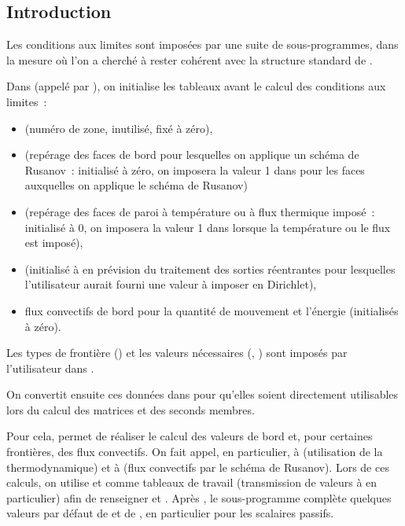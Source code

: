 \subsection*{Introduction}

Les conditions aux limites sont impos\'ees par une suite de sous-programmes,
dans la mesure o\`u l'on a cherch\'e \`a rester coh\'erent avec la structure
standard de \CS.

Dans  (appel\'e par ), on initialise les tableaux
avant le calcul des conditions aux limites~:
\begin{itemize}
\item {} (num\'ero de zone, inutilis\'e, fix\'e \`a z\'ero),
\item {} (rep\'erage des faces de bord pour
lesquelles on applique un sch\'ema de Rusanov~: initialis\'e \`a z\'ero,
on imposera la valeur 1 dans  pour les faces auxquelles on applique le sch\'ema
de Rusanov)
\item {} (rep\'erage des faces de paroi \`a temp\'erature ou
\`a flux thermique impos\'e~: initialis\'e \`a 0, on imposera la valeur 1
dans  lorsque la temp\'erature ou le flux est impos\'e),
\item {} (initialis\'e \`a  en pr\'evision
du traitement des sorties r\'eentrantes pour lesquelles l'utilisateur
aurait fourni une valeur \`a imposer en Dirichlet),
\item flux convectifs de bord pour la quantit\'e de mouvement et l'\'energie
(initialis\'es \`a z\'ero).
\end{itemize}


\bigskip
Les types de fronti\`ere () et les valeurs n\'ecessaires
(, ) sont impos\'es par l'utilisateur dans .

On convertit ensuite ces donn\'ees dans  pour qu'elles
soient directement utilisables lors du calcul des matrices et des seconds membres.

Pour cela,  permet de r\'ealiser le calcul des valeurs de bord et,
pour certaines fronti\`eres, des flux convectifs. On fait appel,
en particulier,
\`a  (utilisation de la thermodynamique) et \`a 
(flux convectifs par le sch\'ema de Rusanov). Lors de ces calculs, on utilise
 et  comme tableaux de travail (transmission de valeurs
\`a  en particulier) afin de renseigner  et
.
Apr\`es ,
le sous-programme  compl\`ete quelques valeurs par d\'efaut
de  et de , en particulier pour les scalaires passifs.

